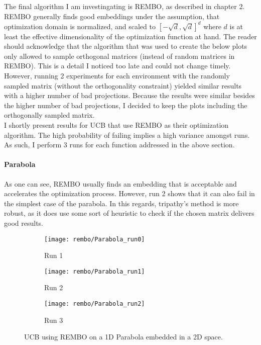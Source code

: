 The final algorithm I am investingating is REMBO, as described in chapter 2.
REMBO generally finds good embeddings under the assumption, that optimization domain is normalized, and scaled to $[-\sqrt{d}, \sqrt{d}]^d$ where $d$ is at least the effective dimensionality of the optimization function at hand. 
The reader should acknowledge that the algorithm that was used to create the below plots only allowed to sample orthogonal matrices (instead of random matrices in REMBO).
This is a detail I noticed too late and could not change timely.
However, running 2 experiments for each environment with the randomly sampled matrix (without the orthogonality constraint) yielded similar results with a higher number of bad projections.
Because the results were similar besides the higher number of bad projections, I decided to keep the plots including the orthogonally sampled matrix. \\

I shortly present results for UCB that use REMBO as their optimization algorithm.
The high probability of failing implies a high variance amongst runs. 
As such, I perform 3 runs for each function addressed in the above section.

\paragraph{Parabola}
As one can see, REMBO usually finds an embedding that is acceptable and accelerates the optimization process.
However, run 2 shows that it can also fail in the simplest case of the parabola.
In this regards, tripathy's method is more robust, as it does use some sort of heuristic to check if the chosen matrix delivers good results.


\begin{figure}[H]
\center
    \begin{subfigure}[b]{0.30\textwidth}
        \texttt{[image: rembo/Parabola\_run0]}
        \label{fig:gull}
         \caption{Run 1}
    \end{subfigure}
        \begin{subfigure}[b]{0.30\textwidth}
        \texttt{[image: rembo/Parabola\_run1]}
        \label{fig:gull}
        \caption{Run 2}
    \end{subfigure}
    \begin{subfigure}[b]{0.30\textwidth}
        \texttt{[image: rembo/Parabola\_run2]}
        \label{fig:gull}
               \caption{Run 3}
    \end{subfigure}
        \caption{UCB using REMBO on a 1D Parabola embedded in a 2D space.
    }\label{fig:animals}
\end{figure}

